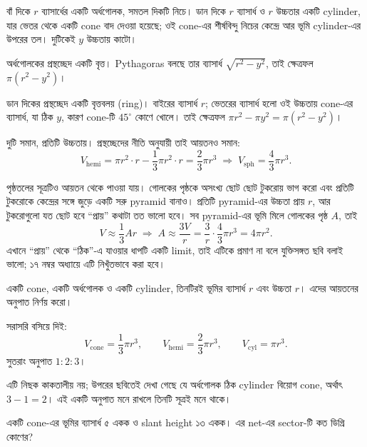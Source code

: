 \documentclass[11pt]{article}
\begin{document}
বাঁ দিকে $r$ ব্যাসার্ধের একটি অর্ধগোলক, সমতল দিকটি নিচে। ডান দিকে $r$ ব্যাসার্ধ ও
$r$ উচ্চতার একটি cylinder, যার ভেতর থেকে একটি cone বাদ দেওয়া হয়েছে; ওই cone-এর
শীর্ষবিন্দু নিচের কেন্দ্রে আর ভূমি cylinder-এর উপরের তল। দুটিকেই $y$ উচ্চতায়
কাটো।

অর্ধগোলকের প্রস্থচ্ছেদ একটি বৃত্ত। Pythagoras বলছে তার ব্যাসার্ধ
$\sqrt{r^{2}-y^{2}}$, তাই ক্ষেত্রফল $\pi(r^{2}-y^{2})$।

ডান দিকের প্রস্থচ্ছেদ একটি বৃত্তবলয় (ring)। বাইরের ব্যাসার্ধ $r$; ভেতরের
ব্যাসার্ধ হলো ওই উচ্চতায় cone-এর ব্যাসার্ধ, যা ঠিক $y$, কারণ cone-টি $45^{\circ}$
কোণে খোলে। তাই ক্ষেত্রফল $\pi r^{2} - \pi y^{2} = \pi (r^{2}-y^{2})$।

দুটি সমান, প্রতিটি উচ্চতায়। প্রস্থচ্ছেদের নীতি অনুযায়ী তাই আয়তনও সমান:
\[
  V_{\mathrm{hemi}} = \pi r^{2} \cdot r - \frac{1}{3}\pi r^{2} \cdot r
  = \frac{2}{3}\pi r^{3}
  \;\Longrightarrow\;
  V_{\mathrm{sph}} = \frac{4}{3}\pi r^{3} .
\]

পৃষ্ঠতলের সূত্রটিও আয়তন থেকে পাওয়া যায়। গোলকের পৃষ্ঠকে অসংখ্য ছোট ছোট টুকরোয়
ভাগ করো এবং প্রতিটি টুকরোকে কেন্দ্রের সঙ্গে জুড়ে একটি সরু pyramid বানাও। প্রতিটি
pyramid-এর উচ্চতা প্রায় $r$, আর টুকরোগুলো যত ছোট হবে ``প্রায়'' কথাটা তত ভালো
হবে। সব pyramid-এর ভূমি মিলে গোলকের পৃষ্ঠ $A$, তাই
\[
  V \approx \frac{1}{3} A r
  \;\Longrightarrow\;
  A \approx \frac{3V}{r} = \frac{3}{r} \cdot \frac{4}{3}\pi r^{3} = 4\pi r^{2} .
\]
এখানে ``প্রায়'' থেকে ``ঠিক''-এ যাওয়ার ধাপটি একটি limit, তাই এটিকে প্রমাণ না বলে
যুক্তিসঙ্গত ছবি বলাই ভালো; ১৭ নম্বর অধ্যায়ে এটি নিখুঁতভাবে করা হবে।

\begin{example}
একটি cone, একটি অর্ধগোলক ও একটি cylinder, তিনটিরই ভূমির ব্যাসার্ধ $r$ এবং উচ্চতা
$r$। এদের আয়তনের অনুপাত নির্ণয় করো।
\end{example}

\begin{solbox}
সরাসরি বসিয়ে দিই:
\[
  V_{\mathrm{cone}} = \frac{1}{3}\pi r^{3}, \qquad
  V_{\mathrm{hemi}} = \frac{2}{3}\pi r^{3}, \qquad
  V_{\mathrm{cyl}} = \pi r^{3} .
\]
সুতরাং অনুপাত $1 : 2 : 3$।

এটি নিছক কাকতালীয় নয়; উপরের ছবিতেই দেখা গেছে যে অর্ধগোলক ঠিক cylinder বিয়োগ
cone, অর্থাৎ $3 - 1 = 2$। এই একটি অনুপাত মনে রাখলে তিনটি সূত্রই মনে থাকে।
\end{solbox}

\begin{example}
একটি cone-এর ভূমির ব্যাসার্ধ ৫ একক ও slant height ১৩ একক। এর net-এর sector-টি
কত ডিগ্রি কোণের?
\end{example}
\end{document}
